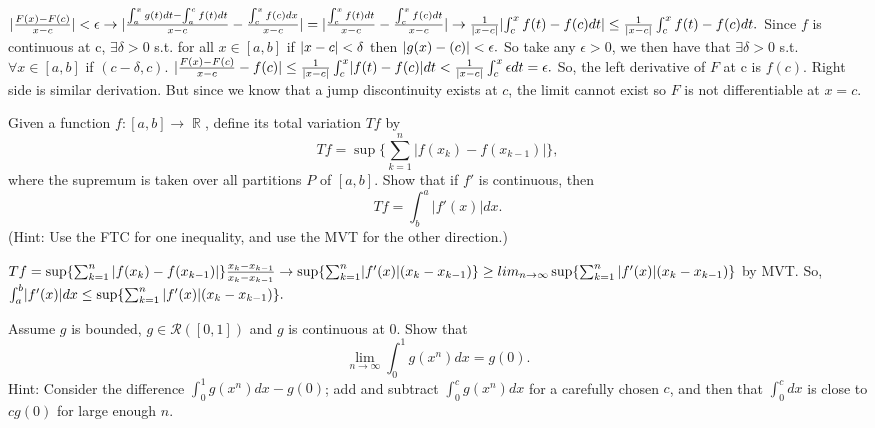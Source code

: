 \documentclass[12pt,letterpaper,boxed]{hmcpset}
\DeclareMathOperator{\R}{\mathbb{R}}
\DeclarePairedDelimiter\abs{\lvert}{\rvert}%
\begin{document}
\begin{solution}
$|\frac{F(x) - F(c)}{x - c}| < \epsilon \rightarrow |\frac{\int_{a}^{x}g(t)dt - \int_{a}^{c}f(t)dt}{x - c} - \frac{\int_{c}^{x}f(c)dx}{x-c}|=|\frac{\int_{c}^{x}f(t)dt}{x-c} - \frac{\int_{c}^{x}f(c)dt}{x-c}| \rightarrow \frac{1}{\abs{x-c}}\abs{\int_{c}^{x}f(t) - f(c)dt}\leq \frac{1}{\abs{x-c}}\int_{c}^{x}f(t) - f(c)dt.$ Since $f$ is continuous at c, $\exists\delta>0$ s.t. for all $x\in[a,b]$ if $\abs{x-c} < \delta$ then $\abs{g(x)-(c)}<\epsilon.$ So take any $\epsilon>0$, we then have that $\exists\delta>0$ s.t. $\forall x\in[a,b]$ if $(c - \delta,c)$. $\abs{\frac{F(x) - F(c)}{x - c} - f(c)} \leq \frac{1}{\abs{x-c}}\int_{c}^{x}\abs{f(t) - f(c)}dt < \frac{1}{\abs{x - c}}\int_{c}^{x}\epsilon dt=\epsilon.$ So, the left derivative of $F$ at c is $f(c)$. Right side is similar derivation. But since we know that a jump discontinuity exists at $c$, the limit cannot exist so $F$ is not differentiable at $x=c.$
\end{solution}

\begin{problem}[Exercise 2.19]
Given a function $f : [a,b]\rightarrow \R$, define its total variation $T f$ by $$T f = \sup\{\sum_{k=1}^{n} |f(x_k) - f(x_{k-1})|\},$$ where the supremum is taken over all partitions $P$ of $[a,b]$. Show that if $f'$ is continuous, then $$T f = \int_{b}^{a}|f'(x)|dx.$$ (Hint: Use the FTC for one inequality, and use the MVT for the other direction.)
\end{problem}

\begin{solution}
$T f = \sup\{\sum_{k=1}^{n} |f(x_k) - f(x_{k-1})|\} \frac{x_k - x_{k-1}}{x_k - x_{k-1}} \rightarrow \sup\{\sum_{k=1}^{n}\abs{f'(x)}(x_k - x_{k-1})\} \ge \\lim_{n \rightarrow \infty} \sup \{\sum_{k=1}^{n}|f'(x)|(x_k - x_{k-1})\}$ by MVT. So, $\int_{a}^{b}\abs{f'(x)}dx \leq \sup \{\sum_{k=1}^{n}|f'(x)|(x_k - x_{k-1})\}.$
\end{solution}

\begin{problem}[Exercise 2.20]
Assume $g$ is bounded, $g \in \mathcal{R}([0,1])$ and $g$ is continuous at 0. Show that $$\lim_{n\rightarrow \infty}\int_{0}^{1}g(x^{n})dx = g(0).$$ Hint: Consider the difference $\int_{0}^{1}g(x^{n})dx - g(0)$; add and subtract $\int_{0}^{c} g(x^{n})dx$ for a carefully chosen $c$, and then that $\int_{0}^{c}dx$ is close to $cg(0)$ for large enough $n.$
\end{problem}
\end{document}
